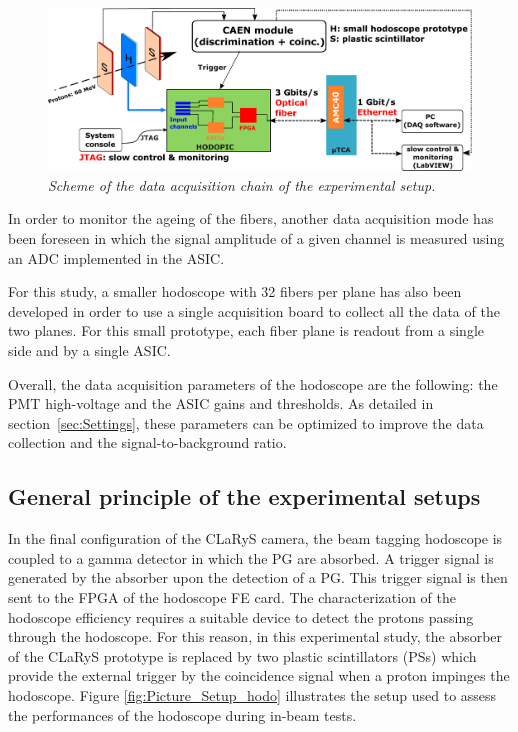 \documentclass[a4paper,11pt]{article}
\begin{document}
\begin{figure}[htb]
\centering
\includegraphics[width=1\textwidth]{figures/Scheme_Setup_Nice_08_2019.pdf}
\caption{\small{\textit{Scheme of the data acquisition chain of the experimental setup.}}}
\label{fig:Scheme_Setup_hodo}
\end{figure} 

In order to monitor the ageing of the fibers, another data acquisition mode has been foreseen in which the signal amplitude of a given channel is measured using an ADC implemented in the ASIC.

For this study, a smaller hodoscope with 32 fibers per plane has also been developed in order to use a single acquisition board to collect all the data of the two planes. For this small prototype, each fiber plane is readout from a single side and by a single ASIC. 

Overall, the data acquisition parameters of the hodoscope are the following: the PMT high-voltage and the ASIC gains and thresholds. As detailed in section~\ref{sec:Settings}, these parameters can be optimized to improve the data collection and the signal-to-background ratio.


\subsection{General principle of the experimental setups}
\label{GeneralPrinc}

In the final configuration of the CLaRyS camera, the beam tagging hodoscope is coupled to a gamma detector in which the PG are absorbed. A trigger signal is generated by the absorber upon the detection of a PG. This trigger signal is then sent to the FPGA of the hodoscope FE card. The characterization of the hodoscope efficiency requires a suitable device to detect the protons passing through the hodoscope. For this reason, in this experimental study, the absorber of the CLaRyS prototype is replaced by two plastic scintillators (PSs) which provide the external trigger by the coincidence signal when a proton impinges the hodoscope. Figure \ref{fig:Picture_Setup_hodo} illustrates the setup used to assess the performances of the hodoscope during in-beam tests. 
\end{document}
